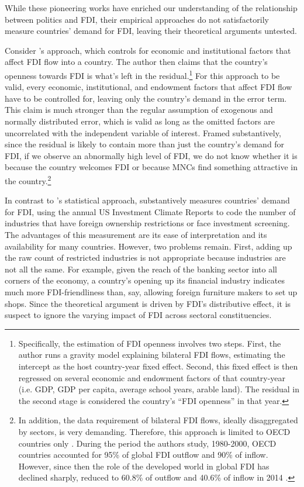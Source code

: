 While these pioneering works have enriched our understanding of the relationship between politics and FDI, their empirical approaches do not satisfactorily measure countries' demand for FDI, leaving their theoretical arguments untested.

Consider \citet{Pinto2013}'s approach, which controls for economic and institutional factors that affect FDI flow into a country. The author then claims that the country's openness towards FDI is what's left in the residual.\footnote{Specifically, the estimation of FDI openness involves two steps. First, the author runs a gravity model explaining bilateral FDI flows, estimating the intercept as the host country-year fixed effect. Second, this fixed effect is then regressed on several economic and endowment factors of that country-year (i.e. GDP, GDP per capita, average school years, arable land). The residual in the second stage is considered the country's ``FDI openness'' in that year.} For this approach to be valid, every economic, institutional, and endowment factors that affect FDI flow have to be controlled for, leaving only the country's demand in the error term. This claim is much stronger than the regular assumption of exogenous and normally distributed error, which is valid as long as the omitted factors are uncorrelated with the independent variable of interest. Framed substantively, since the residual is likely to contain more than just the country's demand for FDI, if we observe an abnormally high level of FDI, we do not know whether it is because the country welcomes FDI or because MNCs find something attractive in the country.\footnote{In addition, the data requirement of bilateral FDI flows, ideally disaggregated by sectors, is very demanding. Therefore, this approach is limited to OECD countries only \citep{Pinto2008}. During the period the authors study, 1980-2000, OECD countries accounted for 95\% of global FDI outflow and 90\% of inflow. However, since then the role of the developed world in global FDI has declined sharply, reduced to 60.8\% of outflow and 40.6\% of inflow in 2014 \citep{UNCTAD2015}.}

In contrast to \citet{Pinto2013}'s statistical approach, \citet{Pandya2014, Pandya2016} substantively measures countries' demand for FDI, using the annual US Investment Climate Reports to code the number of industries that have foreign ownership restrictions or face investment screening. The advantages of this measurement are its ease of interpretation and its availability for many countries. However, two problems remain. First, adding up the raw count of restricted industries is not appropriate because industries are not all the same. For example, given the reach of the banking sector into all corners of the economy, a country's opening up its financial industry indicates much more FDI-friendliness than, say, allowing foreign furniture makers to set up shops. Since the theoretical argument is driven by FDI's distributive effect, it is suspect to ignore the varying impact of FDI across sectoral constituencies. 

